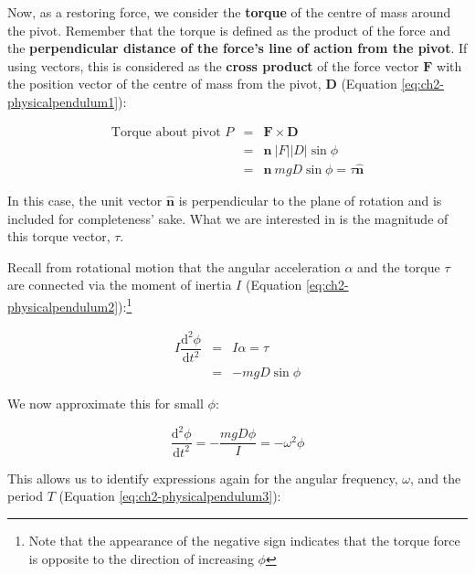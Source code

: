 \documentclass[
]{book}
\begin{document}
Now, as a restoring force, we consider the \textbf{torque} of the centre of mass around the pivot. Remember that the torque is defined as the product of the force and the \textbf{perpendicular distance of the force's line of action from the pivot}. If using vectors, this is considered as the \textbf{cross product} of the force vector \(\mathbf{F}\) with the position vector of the centre of mass from the pivot, \(\mathbf{D}\) (Equation \eqref{eq:ch2-physicalpendulum1}):

\begin{equation}
\begin{array}{rcl}
\textrm{Torque about pivot $P$} &=& \mathbf{F} \times \mathbf{D} \\
&=& \mathbf{\hat{n}}~ |F| |D| \sin \phi \\
&=& \mathbf{\hat{n}}~ mg D \sin \phi = \tau \mathbf{\hat{n}} 
\end{array}
\label{eq:ch2-physicalpendulum1}
\end{equation}

In this case, the unit vector \(\mathbf{\hat{n}}\) is perpendicular to the plane of rotation and is included for completeness' sake. What we are interested in is the magnitude of this torque vector, \(\tau\).

Recall from rotational motion that the angular acceleration \(\alpha\) and the torque \(\tau\) are connected via the moment of inertia \(I\) (Equation \eqref{eq:ch2-physicalpendulum2}):\footnote{Note that the appearance of the negative sign indicates that the torque force is opposite to the direction of increasing \(\phi\)}

\begin{equation}
\begin{array}{rcl}
I \dfrac{\mathrm{d}^2 \phi}{\mathrm{d} t^2}  &=& I\alpha =\tau \\
&=& -mgD \sin \phi
\end{array}
\label{eq:ch2-physicalpendulum2}
\end{equation}

We now approximate this for small \(\phi\):

\begin{equation}
\frac{\mathrm{d}^2 \phi}{\mathrm{d} t^2} = -\frac{mgD\phi}{I} = -\omega^2 \phi
\end{equation}

This allows us to identify expressions again for the angular frequency, \(\omega\), and the period \(T\) (Equation \eqref{eq:ch2-physicalpendulum3}):
\end{document}
